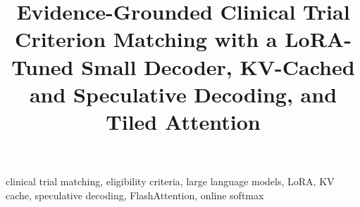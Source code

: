 \documentclass[conference]{IEEEtran}
\begin{document}
\title{Evidence-Grounded Clinical Trial Criterion Matching with a LoRA-Tuned Small Decoder,
KV-Cached and Speculative Decoding, and Tiled Attention}

\author{\IEEEauthorblockN{}}

\IEEEaftertitletext{}

\maketitle

\begin{abstract}

\end{abstract}

\begin{IEEEkeywords}
clinical trial matching, eligibility criteria, large language models, LoRA, KV cache,
speculative decoding, FlashAttention, online softmax
\end{IEEEkeywords}












\appendices

\end{document}
